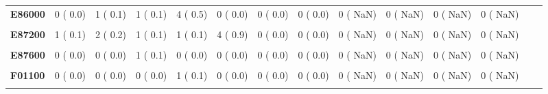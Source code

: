 \documentclass[
]{article}
\begin{document}
\begin{table}[H]
\begin{tabular}[t]{>{\raggedright\arraybackslash}p{5em}ccccccccccccc}
\textbf{E86000} & 0 (  0.0) & 1 (  0.1) & 1 (  0.1) & 4 (  0.5) & 0 (  0.0) & 0 (  0.0) & 0 (  0.0) & 0 (  NaN) & 0 (  NaN) & 0 (  NaN) & 0 (  NaN) &  & \\
\textbf{\cellcolor{gray!10}{E87000}} & \cellcolor{gray!10}{1 (  0.1)} & \cellcolor{gray!10}{1 (  0.1)} & \cellcolor{gray!10}{0 (  0.0)} & \cellcolor{gray!10}{0 (  0.0)} & \cellcolor{gray!10}{1 (  0.2)} & \cellcolor{gray!10}{0 (  0.0)} & \cellcolor{gray!10}{0 (  0.0)} & \cellcolor{gray!10}{0 (  NaN)} & \cellcolor{gray!10}{0 (  NaN)} & \cellcolor{gray!10}{0 (  NaN)} & \cellcolor{gray!10}{0 (  NaN)} & \cellcolor{gray!10}{} & \cellcolor{gray!10}{}\\
\textbf{E87200} & 1 (  0.1) & 2 (  0.2) & 1 (  0.1) & 1 (  0.1) & 4 (  0.9) & 0 (  0.0) & 0 (  0.0) & 0 (  NaN) & 0 (  NaN) & 0 (  NaN) & 0 (  NaN) &  & \\
\textbf{\cellcolor{gray!10}{E87500}} & \cellcolor{gray!10}{0 (  0.0)} & \cellcolor{gray!10}{0 (  0.0)} & \cellcolor{gray!10}{2 (  0.2)} & \cellcolor{gray!10}{1 (  0.1)} & \cellcolor{gray!10}{1 (  0.2)} & \cellcolor{gray!10}{1 (  0.4)} & \cellcolor{gray!10}{0 (  0.0)} & \cellcolor{gray!10}{0 (  NaN)} & \cellcolor{gray!10}{0 (  NaN)} & \cellcolor{gray!10}{0 (  NaN)} & \cellcolor{gray!10}{0 (  NaN)} & \cellcolor{gray!10}{} & \cellcolor{gray!10}{}\\
\textbf{E87600} & 0 (  0.0) & 0 (  0.0) & 1 (  0.1) & 0 (  0.0) & 0 (  0.0) & 0 (  0.0) & 0 (  0.0) & 0 (  NaN) & 0 (  NaN) & 0 (  NaN) & 0 (  NaN) &  & \\
\textbf{\cellcolor{gray!10}{E88000}} & \cellcolor{gray!10}{0 (  0.0)} & \cellcolor{gray!10}{0 (  0.0)} & \cellcolor{gray!10}{0 (  0.0)} & \cellcolor{gray!10}{3 (  0.4)} & \cellcolor{gray!10}{1 (  0.2)} & \cellcolor{gray!10}{0 (  0.0)} & \cellcolor{gray!10}{0 (  0.0)} & \cellcolor{gray!10}{0 (  NaN)} & \cellcolor{gray!10}{0 (  NaN)} & \cellcolor{gray!10}{0 (  NaN)} & \cellcolor{gray!10}{0 (  NaN)} & \cellcolor{gray!10}{} & \cellcolor{gray!10}{}\\
\textbf{F01100} & 0 (  0.0) & 0 (  0.0) & 0 (  0.0) & 1 (  0.1) & 0 (  0.0) & 0 (  0.0) & 0 (  0.0) & 0 (  NaN) & 0 (  NaN) & 0 (  NaN) & 0 (  NaN) &  & \\
\textbf{\cellcolor{gray!10}{F01900}} & \cellcolor{gray!10}{1 (  0.1)} & \cellcolor{gray!10}{2 (  0.2)} & \cellcolor{gray!10}{1 (  0.1)} & \cellcolor{gray!10}{1 (  0.1)} & \cellcolor{gray!10}{1 (  0.2)} & \cellcolor{gray!10}{0 (  0.0)} & \cellcolor{gray!10}{0 (  0.0)} & \cellcolor{gray!10}{0 (  NaN)} & \cellcolor{gray!10}{0 (  NaN)} & \cellcolor{gray!10}{0 (  NaN)} & \cellcolor{gray!10}{0 (  NaN)} & \cellcolor{gray!10}{} & \cellcolor{gray!10}{}\\

\end{tabular}
\end{table}
\end{document}
